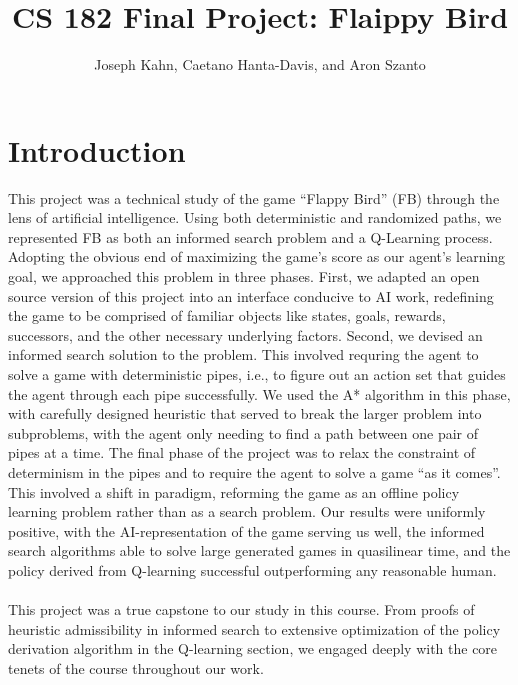 \documentclass[11pt]{article}
\title{CS 182 Final Project: Flaippy Bird}
\author{Joseph Kahn, Caetano Hanta-Davis, and Aron Szanto}
\begin{document}
\maketitle{}


\section{Introduction}


This project was a technical study of the game ``Flappy Bird'' (FB) through the lens
of artificial intelligence. Using both deterministic and randomized paths,
we represented FB as both an informed search problem and a Q-Learning process.
Adopting the obvious end of maximizing the game's score as our agent's learning goal,
we approached this problem in three phases. First, we adapted an open source version
of this project into an interface conducive to AI work, redefining the game to be
comprised of familiar objects like states, goals, rewards, successors, and the other
necessary underlying factors. Second, we devised an informed search solution to the problem.
This involved requring the agent to solve a game with deterministic pipes, i.e.,
to figure out an action set that guides the agent through each pipe successfully.
We used the A* algorithm in this phase, with carefully designed heuristic that
served to break the larger problem into subproblems, with the agent only needing
to find a path between one pair of pipes at a time. The final phase of the project
was to relax the constraint of determinism in the pipes and to require the agent
to solve a game ``as it comes''. This involved a shift in paradigm, reforming
the game as an offline policy learning problem rather than as a search problem.
Our results were uniformly positive, with the AI-representation of the game serving
us well, the informed search algorithms able to solve large generated games in
quasilinear time, and the policy derived from Q-learning successful outperforming
any reasonable human.\\\\
This project was a true capstone to our study in this course. From proofs of
heuristic admissibility in informed search to extensive optimization of the policy
derivation algorithm in the Q-learning section, we engaged deeply with the core
tenets of the course throughout our work.
\end{document}
